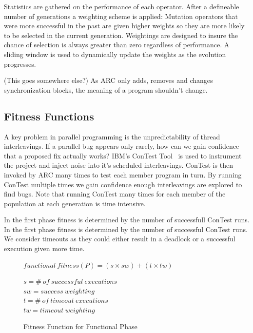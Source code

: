 \documentclass[10pt, conference, compsocconf]{IEEEtran}
\begin{document}
Statistics are gathered on the performance of each operator.  After a
defineable number of generations a weighting scheme is applied:  Mutation
operators that were more successful in the past are given higher weights so
they are more likely to be selected in the current generation.  Weightings are
designed to insure the chance of selection is always greater than zero
regardless of performance.  A sliding window is used to dynamically update the
weights as the evolution progresses.

(This goes somewhere else?) As ARC only adds, removes and changes
synchronization blocks, the meaning of a program shouldn't change.

\subsection{Fitness Functions}
\label{sec:funcfitnessfunctions}

A key problem in parallel programming is the unpredictability of thread
interleavings.  If a parallel bug appears only rarely, how can we gain
confidence that a proposed fix actually works?  IBM's ConTest
Tool~\cite{EFN+02} is used to instrument the project and inject noise into it's
scheduled interleavings. ConTest is then invoked by ARC many times to test each
member program in turn. By running ConTest multiple times we gain confidence
enough interleavings are explored to find bugs. Note that running ConTest many
times for each member of the population at each generation is time intensive.

In the first phase fitness is determined by the number of successfull ConTest
runs. In the first phase fitness is determined by the number of successful
ConTest runs. We consider timeouts as they could either result in a deadlock or
a successful execution given more time.

\begin{figure}
\begin{footnotesize}
\begin{center}
$functional\ fitness(P) = (s \times sw) + (t \times tw)$
\end{center}
\end{footnotesize}
\begin{tiny}
\begin{center}
$s = \#\ of\ successful\ executions$ \\
$sw = success\ weighting$ \\
$t = \#\ of\ timeout\ executions$ \\
$tw = timeout\ weighting$
\end{center}
\end{tiny}
\caption{Fitness Function for Functional Phase}
\label{fig:functional_fitness}
\end{figure}
\end{document}
